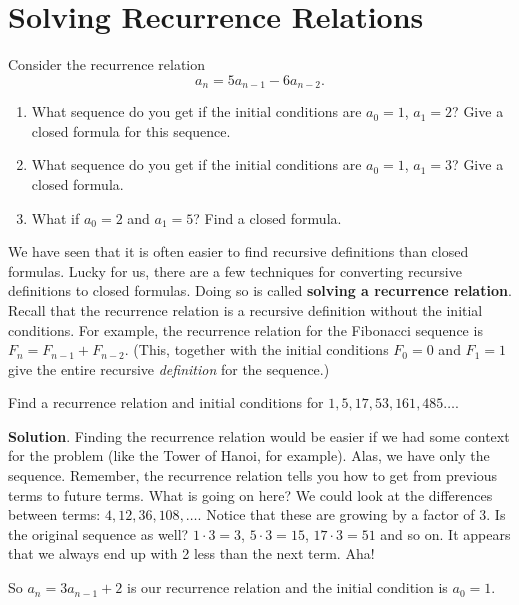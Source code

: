 \documentclass[11pt,]{book}
\newcommand{\terminology}[1]{\textbf{#1}}
\theoremstyle{ptxplainnotitle}
\theoremstyle{ptxplaintitle}
\theoremstyle{ptxdefinitionnotitle}
\theoremstyle{ptxdefinitiontitle}
\theoremstyle{ptxdefinitionnotitle}
\theoremstyle{ptxdefinitiontitle}
\theoremstyle{ptxdefinitionnotitle}
\theoremstyle{ptxdefinitiontitle}
\theoremstyle{ptxdefinitiontitlenonumber}
\theoremstyle{ptxdefinitiontitlenonumber}
\numberwithin{equation}{chapter}
\begin{document}
\section[{Solving Recurrence Relations}]{Solving Recurrence Relations}\label{sec_recurrence}
\begin{investigation}\label{investigation-7}
\hypertarget{p-435}{}%
Consider the recurrence relation%
\begin{equation*}
a_n = 5a_{n-1} - 6a_{n-2}.
\end{equation*}
%
\begin{enumerate}
\item\hypertarget{li-228}{}\hypertarget{p-436}{}%
What sequence do you get if the initial conditions are \(a_0 = 1\), \(a_1 = 2\)? Give a closed formula for this sequence.%
\item\hypertarget{li-229}{}\hypertarget{p-437}{}%
What sequence do you get if the initial conditions are \(a_0 = 1\), \(a_1 = 3\)? Give a closed formula.%
\item\hypertarget{li-230}{}\hypertarget{p-438}{}%
What if \(a_0 = 2\) and \(a_1 = 5\)? Find a closed formula.%
\end{enumerate}
%
\end{investigation}
\hypertarget{p-439}{}%
We have seen that it is often easier to find recursive definitions than closed formulas. Lucky for us, there are a few techniques for converting recursive definitions to closed formulas. Doing so is called \terminology{solving a recurrence relation}. Recall that the recurrence relation is a recursive definition without the initial conditions. For example, the recurrence relation for the Fibonacci sequence is \(F_n = F_{n-1} + F_{n-2}\). (This, together with the initial conditions \(F_0 = 0\) and \(F_1 = 1\) give the entire recursive \emph{definition} for the sequence.)%
\begin{example}\label{example-18}
\hypertarget{p-440}{}%
Find a recurrence relation and initial conditions for \(1, 5, 17, 53, 161, 485\ldots\).%
\par\smallskip%
\noindent\textbf{Solution}.\hypertarget{solution-59}{}\quad%
\hypertarget{p-441}{}%
Finding the recurrence relation would be easier if we had some context for the problem (like the Tower of Hanoi, for example). Alas, we have only the sequence. Remember, the recurrence relation tells you how to get from previous terms to future terms. What is going on here? We could look at the differences between terms: \(4, 12, 36, 108, \ldots\). Notice that these are growing by a factor of 3. Is the original sequence as well? \(1\cdot 3 = 3\), \(5 \cdot 3 = 15\), \(17 \cdot 3 = 51\) and so on. It appears that we always end up with 2 less than the next term. Aha!%
\par
\hypertarget{p-442}{}%
So \(a_n = 3a_{n-1} + 2\) is our recurrence relation and the initial condition is \(a_0 = 1\).%
\end{example}
\end{document}
